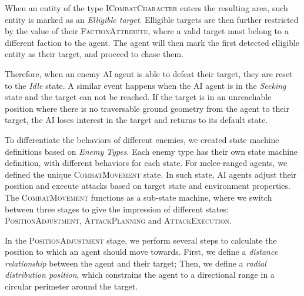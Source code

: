 When an entity of the type \textsc{ICombatCharacter} enters the resulting area, such entity is marked as an \emph{Elligible target}. Elligible targets are then further restricted by the value of their \textsc{FactionAttribute}, where a valid target must belong to a different faction to the agent. The agent will then mark the first detected elligible entity as their target, and proceed to chase them.

Therefore, when an enemy AI agent is able to defeat their target, they are reset to the \emph{Idle} state. A similar event happens when the AI agent is in the \emph{Seeking} state and the target can not be reached. If the target is in an unreachable position where there is no traversable ground geometry from the agent to their target, the AI loses interest in the target and returns to its default state.

To differentiate the behaviors of different enemies, we created state machine definitions based on \emph{Enemy Types}. Each enemy type has their own state machine definition, with different behaviors for each state. For melee-ranged agents, we defined the unique \textsc{CombatMovement} state. In such state, AI agents adjust their position and execute attacks based on target state and environment properties. The \textsc{CombatMovement} functions as a sub-state machine, where we switch between three stages to give the impression of different states: \textsc{PositionAdjustment}, \textsc{AttackPlanning} and \textsc{AttackExecution}.

In the \textsc{PositionAdjustment} stage, we perform several steps to calculate the position to which an agent should move towards. First, we define a \emph{distance relationship} between the agent and their target; Then, we define a \emph{radial distribution position}, which constrains the agent to a directional range in a circular perimeter around the target.



